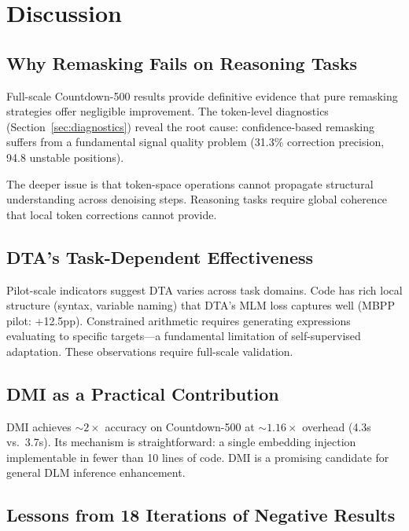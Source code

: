 \documentclass{article}
\begin{document}
\section{Discussion}
\label{sec:discussion}

\subsection{Why Remasking Fails on Reasoning Tasks}

Full-scale Countdown-500 results provide definitive evidence that pure remasking strategies offer negligible improvement. The token-level diagnostics (Section~\ref{sec:diagnostics}) reveal the root cause: confidence-based remasking suffers from a fundamental signal quality problem (31.3\% correction precision, 94.8 unstable positions).

The deeper issue is that token-space operations cannot propagate structural understanding across denoising steps. Reasoning tasks require global coherence that local token corrections cannot provide.

\subsection{DTA's Task-Dependent Effectiveness}

Pilot-scale indicators suggest DTA varies across task domains. Code has rich local structure (syntax, variable naming) that DTA's MLM loss captures well (MBPP pilot: +12.5pp). Constrained arithmetic requires generating expressions evaluating to specific targets---a fundamental limitation of self-supervised adaptation. These observations require full-scale validation.

\subsection{DMI as a Practical Contribution}

DMI achieves ${\sim}2{\times}$ accuracy on Countdown-500 at ${\sim}1.16{\times}$ overhead (4.3s vs.\ 3.7s). Its mechanism is straightforward: a single embedding injection implementable in fewer than 10 lines of code. DMI is a promising candidate for general DLM inference enhancement.

\subsection{Lessons from 18 Iterations of Negative Results}
\label{sec:lessons}
\end{document}
